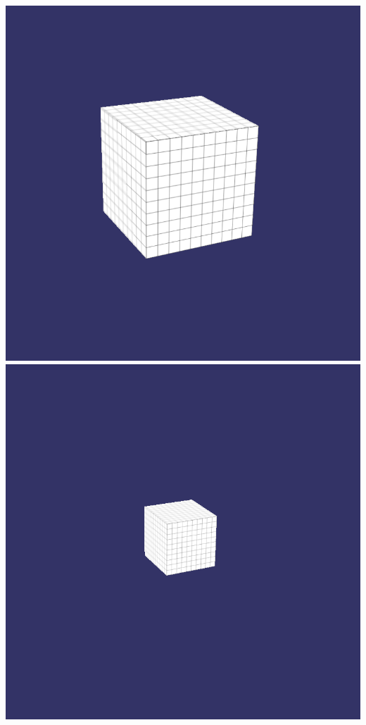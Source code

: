\documentclass[utf8,stillsansserifmath,fleqn,t]{beamer}
\begin{document}
\begin{frame}[label=texture-mipmap-result]
\begin{minipage}{.79\textwidth}
\includegraphics[width=.3\textwidth]{./fig/filter-1-1.png}\hfill
\includegraphics[width=.3\textwidth]{./fig/filter-2-1.png}
\hfill~
\end{minipage}\\
\end{frame}
\end{document}
